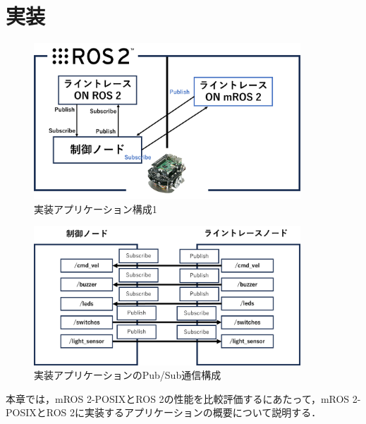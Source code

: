 \chapter{実装}
\begin{figure}[ht]
    \centering
    \includegraphics[width=10cm]{images/fig4_raspimouse_configuration.png}
    \caption{実装アプリケーション構成1}
    \label{fig:mros2_ros2_raspimouse_configuration}
\end{figure}
\begin{figure}[h]
    \centering
    \includegraphics[width=10cm]{images/fig4_pubsub_configuration.png}
    \caption{実装アプリケーションのPub/Sub通信構成}
    \label{fig:mros2_ros2_pubsub_configuration}
\end{figure}
\label{chap:implementation}

本章では，mROS 2-POSIXとROS 2の性能を比較評価するにあたって，mROS 2-POSIXとROS 2に実装するアプリケーションの概要について説明する．
